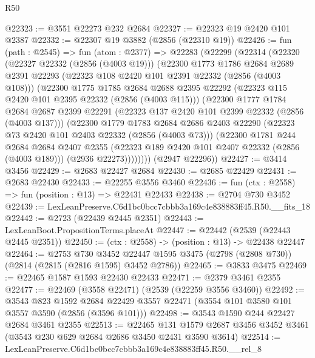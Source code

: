 \begin{lexlean}{R50}
\begin{coremodule}
@22323 := @3551 @22273 @232 @2684
@22327 := @22323 @19 @2420 @101 @2387
@22332 := @22307 @19 @3882 (@2856 (@22310 @19))
@22426 := fun (path : @2545) =>
  fun (atom : @2377) =>
  @22283
    (@22299
      (@22314
        (@22320
          (@22327 @22332 (@2856 (@4003 @19)))
          (@22300
            @1773
            @1786
            @2684
            @2689
            @2391
            @22293
            (@22323 @108 @2420 @101 @2391 @22332 (@2856 (@4003 @108)))
            (@22300
              @1775
              @1785
              @2684
              @2688
              @2395
              @22292
              (@22323 @115 @2420 @101 @2395 @22332 (@2856 (@4003 @115)))
              (@22300
                @1777
                @1784
                @2684
                @2687
                @2399
                @22291
                (@22323 @137 @2420 @101 @2399 @22332 (@2856 (@4003 @137)))
                (@22300
                  @1779
                  @1783
                  @2684
                  @2686
                  @2403
                  @22290
                  (@22323 @73 @2420 @101 @2403 @22332 (@2856 (@4003 @73)))
                  (@22300
                    @1781
                    @244
                    @2684
                    @2684
                    @2407
                    @2355
                    (@22323 @189 @2420 @101 @2407 @22332 (@2856 (@4003 @189)))
                    (@2936 @22273))))))))
      (@2947 @22296))
@22427 := @3414 @3456
@22429 := @2683 @22427 @2684
@22430 := @2685 @22429
@22431 := @2683 @22430
@22433 := @22255 @3556 @3460
@22436 := fun (ctx : @2558) => fun (position : @13) => @22431 @22433
@22438 := @2704 @730 @3452
@22439 := LexLeanPreserve.C6d1bc0bcc7cbbb3a169c4e838883ff45.R50.__fits_18
@22442 := @2723 (@22439 @2445 @2351)
@22443 := LexLeanBoot.PropositionTerms.placeAt
@22447 := @22442 (@2539 (@22443 @2445 @2351))
@22450 := (ctx : @2558) -> (position : @13) -> @22438 @22447
@22464 := @2753
    @730
    @3452
    @22447
    @1595
    @3475
    (@2798 (@2808 @730))
    (@2814 (@2815 (@2816 @1595) @3452 @2786))
@22465 := @3833 @3475
@22469 := @22465 @1587 @1593 @22430 @22433
@22471 := @2379 @3461 @2355
@22477 := @22469 (@3558 @22471) (@2539 (@22259 @3556 @3460))
@22492 := @3543
    @823
    @1592
    @2684
    @22429
    @3557
    @22471
    (@3554 @101 @3580 @101 @3557 @3590 (@2856 (@3596 @101)))
@22498 := @3543 @1590 @244 @22427 @2684 @3461 @2355
@22513 := @22465
    @131
    @1579
    @2687
    @3456
    @3452
    @3461
    (@3543 @230 @629 @2684 @2686 @3450 @2431 @3590 @3614)
@22514 := LexLeanPreserve.C6d1bc0bcc7cbbb3a169c4e838883ff45.R50.__rel_8

\end{coremodule}
\end{lexlean}
